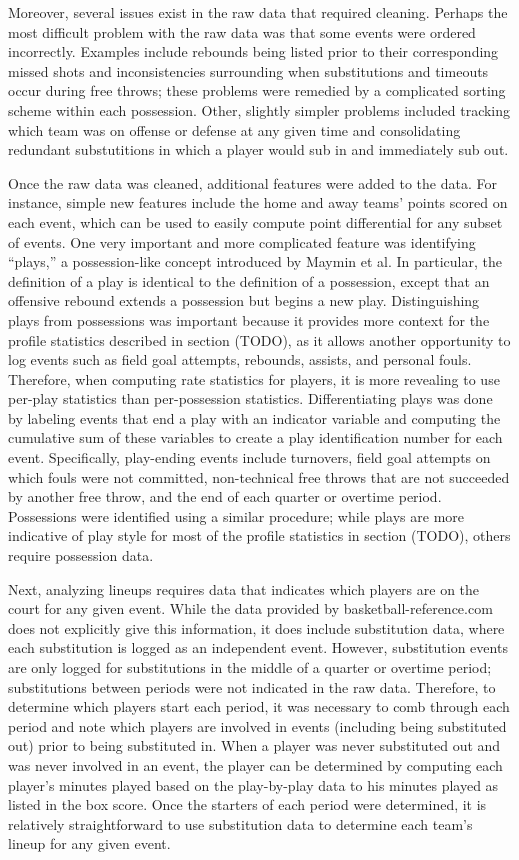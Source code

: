 Moreover, several issues exist in the raw data that required cleaning. Perhaps the
most difficult problem with the raw data was that some events were ordered
incorrectly. Examples include rebounds being listed prior to their corresponding
missed shots and inconsistencies surrounding when substitutions and timeouts occur
during free throws; these problems were remedied by a complicated sorting scheme
within each possession. Other, slightly simpler problems included tracking which
team was on offense or defense at any given time and consolidating redundant
substutitions in which a player would sub in and immediately sub out.

Once the raw data was cleaned, additional features were added to the data. For
instance, simple new features include the home and away teams' points scored on each
event, which can be used to easily compute point differential for any subset of
events. One very important and more complicated feature was identifying ``plays,'' a
possession-like concept introduced by Maymin et al. In particular, the definition of
a play is identical to the definition of a possession, except that an offensive
rebound extends a possession but begins a new play. Distinguishing plays from
possessions was important because it provides more context for the profile
statistics described in section (TODO), as it allows another opportunity to log
events such as field goal attempts, rebounds, assists, and personal fouls.
Therefore, when computing rate statistics for players, it is more revealing to use
per-play statistics than per-possession statistics. Differentiating plays was done
by labeling events that end a play with an indicator variable and computing the
cumulative sum of these variables to create a play identification number for each
event. Specifically, play-ending events include turnovers, field goal attempts on
which fouls were not committed, non-technical free throws that are not succeeded by
another free throw, and the end of each quarter or overtime period. Possessions were
identified using a similar procedure; while plays are more indicative of play style
for most of the profile statistics in section (TODO), others require possession
data.

Next, analyzing lineups requires data that indicates which players are on the court
for any given event. While the data provided by basketball-reference.com does not
explicitly give this information, it does include substitution data, where each
substitution is logged as an independent event. However, substitution events are
only logged for substitutions in the middle of a quarter or overtime period;
substitutions between periods were not indicated in the raw data. Therefore, to
determine which players start each period, it was necessary to comb through each
period and note which players are involved in events (including being substituted
out) prior to being substituted in. When a player was never substituted out and was
never involved in an event, the player can be determined by computing each player's
minutes played based on the play-by-play data to his minutes played as listed in the
box score. Once the starters of each period were determined, it is relatively
straightforward to use substitution data to determine each team's lineup for any
given event.

